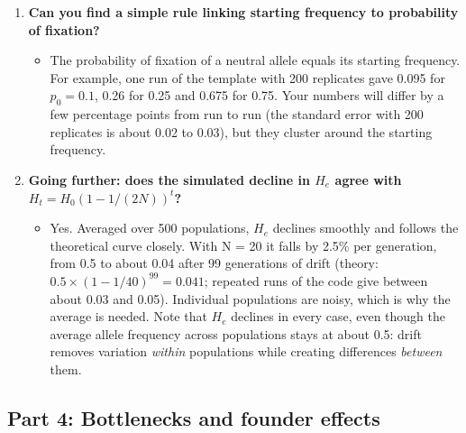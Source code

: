 \documentclass[
  a4paper]{book}
\providecommand{\tightlist}{%
  \setlength{\itemsep}{0pt}\setlength{\parskip}{0pt}}
\begin{document}
\begin{enumerate}
  \begin{itemize}
  \tightlist
  \item
    With N = 20, a single new copy starts at \(1/40 = 0.025\), and roughly 2 to 3\% of populations end up fixed for it (with 200 replicates you might see anywhere from about 0.5\% to 5\%). This matches \(1/(2N)\). Most new neutral mutations, about 39 out of 40 here and 1,999 out of 2,000 in a population of 1000, are lost by chance, usually within a few generations. This is the ``Model 1'' result from the lecture.
  \end{itemize}
\item
  \textbf{Can you find a simple rule linking starting frequency to probability of fixation?}

  \begin{itemize}
  \tightlist
  \item
    The probability of fixation of a neutral allele equals its starting frequency. For example, one run of the template with 200 replicates gave 0.095 for \(p_0 = 0.1\), 0.26 for 0.25 and 0.675 for 0.75. Your numbers will differ by a few percentage points from run to run (the standard error with 200 replicates is about 0.02 to 0.03), but they cluster around the starting frequency.
  \end{itemize}
\item
  \textbf{Going further: does the simulated decline in \(H_e\) agree with \(H_t = H_0 (1 - 1/(2N))^t\)?}

  \begin{itemize}
  \tightlist
  \item
    Yes. Averaged over 500 populations, \(H_e\) declines smoothly and follows the theoretical curve closely. With N = 20 it falls by 2.5\% per generation, from 0.5 to about 0.04 after 99 generations of drift (theory: \(0.5 \times (1 - 1/40)^{99} = 0.041\); repeated runs of the code give between about 0.03 and 0.05). Individual populations are noisy, which is why the average is needed. Note that \(H_e\) declines in every case, even though the average allele frequency across populations stays at about 0.5: drift removes variation \emph{within} populations while creating differences \emph{between} them.
  \end{itemize}
\end{enumerate}

\subsection{Part 4: Bottlenecks and founder effects}\label{part-4-bottlenecks-and-founder-effects-1}
\end{document}
